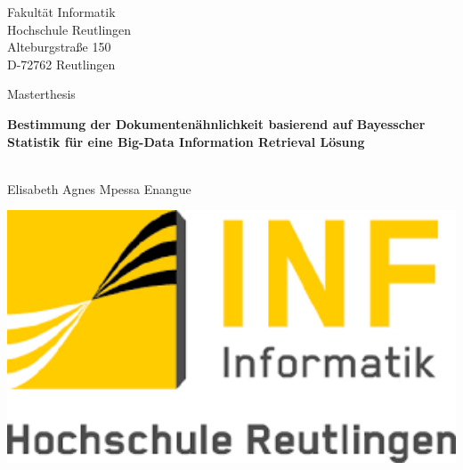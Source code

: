 \documentclass[paper=a4,       %
					 11pt,
					 BCOR0mm,  %
					 DIV10,    %
					 automark, %
					 twoside,
					 halfparskip,
					 bibtotoc,
					 headsepline,
					 normalheadings,
					 appendixprefix,
					 pagesize  %
 ]{scrbook}
\begin{document}
\pagestyle{plain}
\begin{titlepage}
\begin{sffamily}
\begin{center}
Fakult\"at Informatik\\
Hochschule Reutlingen\\
Alteburgstra\ss{}e 150\\
D-72762 Reutlingen\\
\end{center}

\vspace{3.5cm}

\begin{center}
{Masterthesis}\\
\vspace{0.5cm}
\begin{minipage}{8.5cm}
\begin{center}
 
  \Large \textbf{Bestimmung der Dokumenten\"ahnlichkeit basierend auf Bayesscher Statistik f\"ur eine Big-Data Information Retrieval L\"osung}
 
\end{center}
\end{minipage}
\\
\vspace{1cm}
{Elisabeth Agnes Mpessa Enangue}
\end{center}

\vspace{1.0cm}

\begin{center}
\begin{minipage}{3cm}
\begin{center}
	\includegraphics[width=2\textwidth]{./gfx/logo_INFFH.png}
	

\end{center}
\end{minipage}
\end{center}
\end{sffamily}
\end{titlepage}
\end{document}
